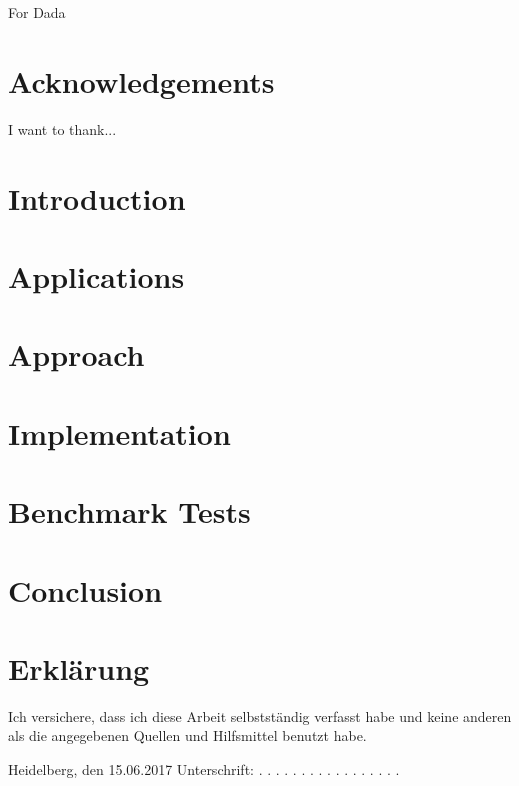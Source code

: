 \documentclass[12pt, twoside]{report}
\begin{document}





\chapter*{}
For Dada

\chapter*{Acknowledgements}
I want to thank...

\tableofcontents

\chapter{Introduction}

\chapter{Applications}

\chapter{Approach}

\chapter{Implementation}

\chapter{Benchmark Tests}

\chapter{Conclusion}


\newpage
%
\printbibliography 

\chapter*{Erklärung}
 
 
 
Ich versichere, dass ich diese Arbeit selbstständig verfasst habe und keine anderen als die angegebenen Quellen und Hilfsmittel benutzt habe. 
 
 
 
 \vspace{3cm}
 
Heidelberg, den 15.06.2017 \hspace{1cm}                         Unterschrift:  . . . . . . . . . . . . . . . . .
\end{document}
